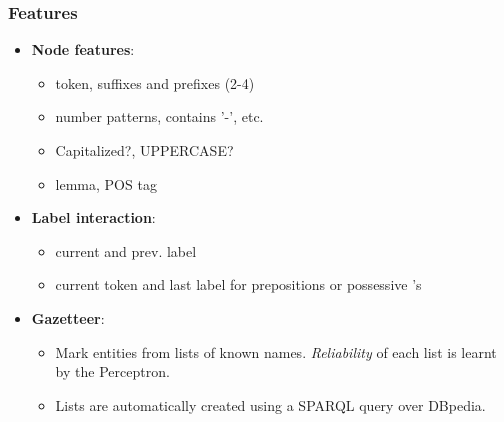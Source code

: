 \documentclass[10pt]{beamer}
\begin{document}
\begin{frame}
\frametitle{Features}

\begin{itemize}
 \item \textbf{Node features}: 
\begin{itemize}
	\item token, suffixes and prefixes (2-4)
	\item number patterns, contains '-', etc. 
	\item Capitalized?, UPPERCASE?
	\item lemma, POS tag
\end{itemize}

 \item \textbf{Label interaction}: 

\begin{itemize}
	\item current and prev. label
	\item current token and last label for prepositions or possessive 's 
\end{itemize}

 \item \textbf{Gazetteer}: 

\begin{itemize}
	\item Mark entities from lists of known names. \emph{Reliability} of each list is learnt by the Perceptron.
	\item Lists are automatically created using a SPARQL query over DBpedia. 
\end{itemize} 
\end{itemize} 
\end{frame}


\end{document}
